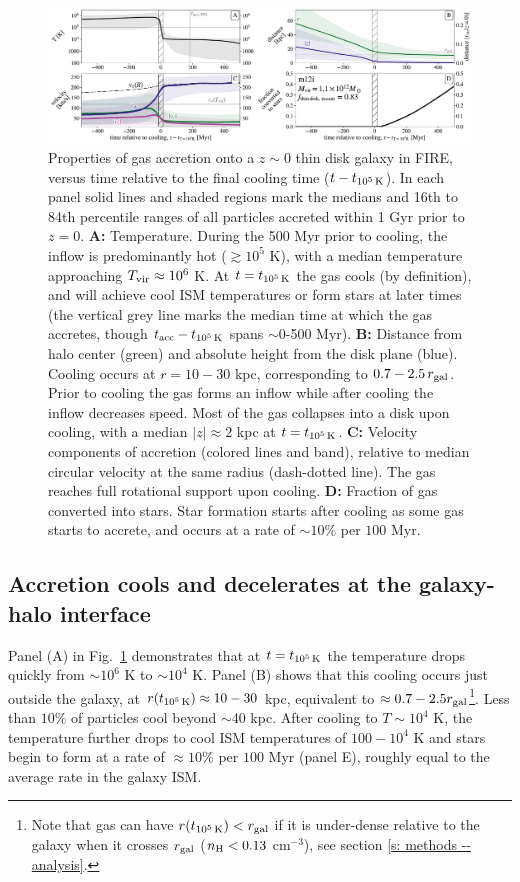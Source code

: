\documentclass[fleqn,usenatbib]{mnras}
\newcommand{\tcools}{t_{10^5\,{\rm K}}}
\newcommand{\tacc}{t_{\rm acc}}
\newcommand{\Tvir}{T_{\rm vir}}
\begin{document}
\begin{figure}
\includegraphics[width=\textwidth]{figures/before_and_after/before_and_after_characteristics_m12i_md.pdf}
\caption{
Properties of gas accretion onto a $z\sim0$ thin disk galaxy in FIRE, versus time relative to the final cooling time ($t - \tcools$).
In each panel solid lines and shaded regions mark the medians and 16th to 84th percentile ranges of all particles accreted within 1 Gyr prior to $z=0$. 
\textbf{A:}
Temperature.
During the 500 Myr prior to cooling, the inflow is predominantly hot ($\gtrsim 10^5$ K), with a median temperature approaching $\Tvir\approx10^6$ K.
At $t = \tcools$ the gas cools (by definition), and will achieve cool ISM temperatures or form stars at later times (the vertical grey line marks the median time at which the gas accretes, though $\tacc - \tcools$ spans $\sim$0-500 Myr). 
\textbf{B:}
Distance from halo center (green) and absolute height from the disk plane (blue).
Cooling occurs at $r=10-30$ kpc, corresponding to $0.7-2.5\,r_{\rm gal}$.
Prior to cooling the gas forms an inflow while after cooling the inflow decreases speed.
Most of the gas collapses into a disk upon cooling, with a median $\vert z \vert \approx 2$ kpc at $t=\tcools$.
\textbf{C:}
Velocity components of accretion (colored lines and band), relative to median circular velocity at the same radius (dash-dotted line).
The gas reaches full rotational support upon cooling.
\textbf{D:}
Fraction of gas converted into stars.
Star formation starts after cooling as some gas starts to accrete, and occurs at a rate of $\sim10\%$ per $100$ Myr.
}
\label{f: before and after A}
\end{figure}


\subsection{Accretion cools and decelerates at the galaxy-halo interface}
\label{s: characteristics -- cools}

Panel (A) in Fig.~\ref{f: before and after A} demonstrates that at $t = \tcools$ the temperature drops quickly from $\sim10^6$ K to $\sim10^4$ K.
Panel (B) shows that this cooling occurs just outside the galaxy, at $r(\tcools) \approx 10-30$ kpc, equivalent to $\approx0.7 - 2.5 r_{\rm gal}$\footnote{Note that gas can have $r(\tcools) < r_{\rm gal}$ if it is under-dense relative to the galaxy when it crosses $r_{\rm gal}$ ($n_{\rm H} < 0.13$ cm$^{-3}$), see section \ref{s: methods -- analysis}.}.
Less than $10\%$ of particles cool beyond $\sim 40$ kpc.
After cooling to $T \sim 10^4$ K, the temperature further drops to cool ISM temperatures of $100-10^4$ K and stars begin to form at a rate of $\approx10\%$ per $100$ Myr (panel E), roughly equal to the average rate in the galaxy ISM. 
\end{document}
